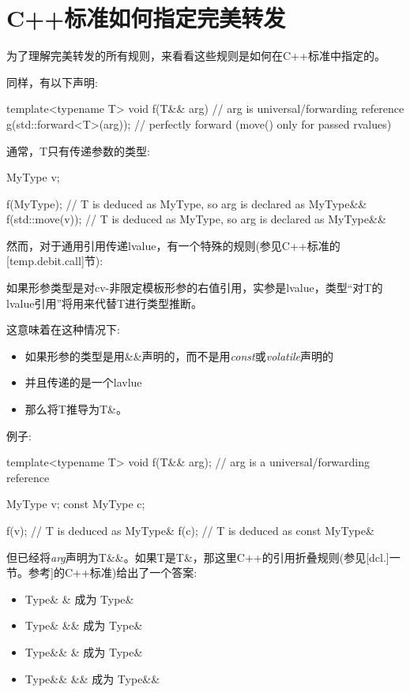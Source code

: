 \section{C++标准如何指定完美转发}
为了理解完美转发的所有规则，来看看这些规则是如何在C++标准中指定的。

同样，有以下声明:

\begin{cppcode}
template<typename T>
void f(T&& arg) // arg is universal/forwarding reference
{
	g(std::forward<T>(arg)); // perfectly forward (move() only for passed rvalues)
}
\end{cppcode}

通常，T只有传递参数的类型:

\begin{cppcode}
MyType v;

f(MyType{}); // T is deduced as MyType, so arg is declared as MyType&&
f(std::move(v)); // T is deduced as MyType, so arg is declared as MyType&&
\end{cppcode}

然而，对于通用引用传递lvalue，有一个特殊的规则(参见C++标准的[temp.debit.call]节):

如果形参类型是对cv-非限定模板形参的右值引用，实参是lvalue，类型“对T的lvalue引用”将用来代替T进行类型推断。



这意味着在这种情况下:

\begin{itemize}
	\item 如果形参的类型是用\&\&声明的，而不是用\textit{const}或\textit{volatile}声明的
	\item 并且传递的是一个lavlue
	\item 那么将T推导为T\&。
\end{itemize}

例子:

\begin{cppcode}
template<typename T>
void f(T&& arg); // arg is a universal/forwarding reference

MyType v;
const MyType c;

f(v); // T is deduced as MyType&
f(c); // T is deduced as const MyType&
\end{cppcode}

但已经将\textit{arg}声明为T\&\&。如果T是T\&，那这里C++的引用折叠规则(参见[dcl.]一节。参考]的C++标准)给出了一个答案:

\begin{itemize}
	\item Type\& \& 成为 Type\&
	\item Type\& \&\& 成为 Type\&
	\item Type\&\& \& 成为 Type\&
	\item Type\&\& \&\& 成为 Type\&\&
\end{itemize}


